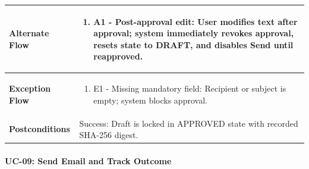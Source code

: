\begin{longtable}{>{\raggedright\arraybackslash}p{}>{\raggedright\arraybackslash}p{}}
\textbf{Alternate Flow} & \begin{enumerate}[nosep,leftmargin=*,label=\arabic*.]

    \item A1 - Post-approval edit: User modifies text after approval; system immediately revokes approval, resets state to DRAFT, and disables Send until reapproved.

\end{enumerate} \\ \hline

\textbf{Exception Flow} & \begin{enumerate}[nosep,leftmargin=*,label=\arabic*.]

    \item E1 - Missing mandatory field: Recipient or subject is empty; system blocks approval.

\end{enumerate} \\ \hline

\textbf{Postconditions} & Success: Draft is locked in APPROVED state with recorded SHA-256 digest. \\ \hline

\end{longtable}

\endgroup





\paragraph*{UC-09: Send Email and Track Outcome}

\begingroup

\small

\setlength{\tabcolsep}{5pt}

\renewcommand{\arraystretch}{1.1}

